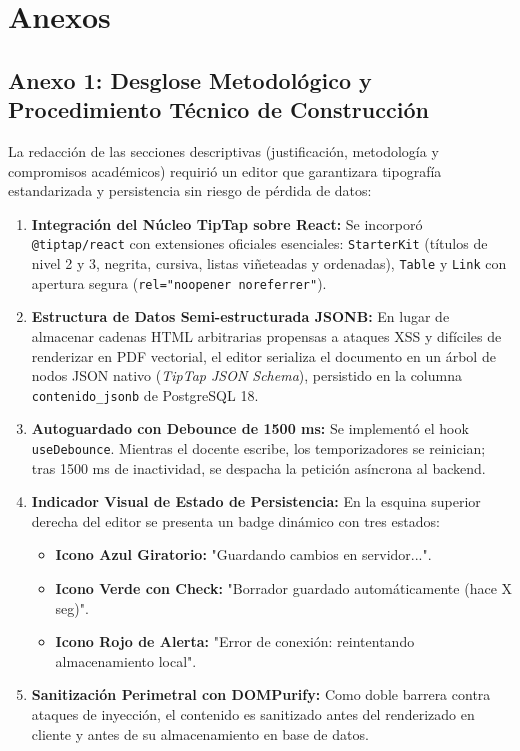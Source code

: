 \documentclass[12pt,a4paper]{article}
\begin{document}
\vspace{0.4cm}

\section{Anexos}

\subsection*{Anexo 1: Desglose Metodológico y Procedimiento Técnico de Construcción}
La redacción de las secciones descriptivas (justificación, metodología y compromisos académicos) requirió un editor que garantizara tipografía estandarizada y persistencia sin riesgo de pérdida de datos:

\begin{enumerate}[leftmargin=1.5em, itemsep=3pt]
    \item \textbf{Integración del Núcleo TipTap sobre React:} Se incorporó \texttt{@tiptap/\allowbreak  react} con extensiones oficiales esenciales: \texttt{StarterKit} (títulos de nivel 2 y 3, negrita, cursiva, listas viñeteadas y ordenadas), \texttt{Table} y \texttt{Link} con apertura segura (\texttt{rel="noopener noreferrer"}).
    \item \textbf{Estructura de Datos Semi-estructurada JSONB:} En lugar de almacenar cadenas HTML arbitrarias propensas a ataques XSS y difíciles de renderizar en PDF vectorial, el editor serializa el documento en un árbol de nodos JSON nativo (\textit{TipTap JSON Schema}), persistido en la columna \texttt{contenido\_\allowbreak  jsonb} de PostgreSQL 18.
    \item \textbf{Autoguardado con Debounce de 1500 ms:} Se implementó el hook \texttt{useDebounce}. Mientras el docente escribe, los temporizadores se reinician; tras 1500 ms de inactividad, se despacha la petición asíncrona al backend.
    \item \textbf{Indicador Visual de Estado de Persistencia:} En la esquina superior derecha del editor se presenta un badge dinámico con tres estados:
    \begin{itemize}[leftmargin=1.2em, itemsep=2pt]
        \item \textbf{Icono Azul Giratorio:} "Guardando cambios en servidor...".
        \item \textbf{Icono Verde con Check:} "Borrador guardado automáticamente (hace X seg)".
        \item \textbf{Icono Rojo de Alerta:} "Error de conexión: reintentando almacenamiento local".
    \end{itemize}
    \item \textbf{Sanitización Perimetral con DOMPurify:} Como doble barrera contra ataques de inyección, el contenido es sanitizado antes del renderizado en cliente y antes de su almacenamiento en base de datos.
\end{enumerate}
\end{document}
